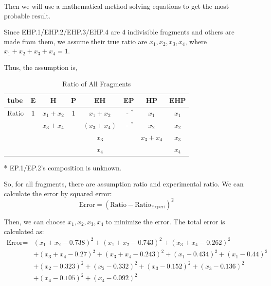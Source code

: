 \documentclass{article}
\begin{document}
            Then we will use a mathematical method solving equations to get the most probable result.

            Since EHP.1/EHP.2/EHP.3/EHP.4 are 4 indivisible fragments and others are made from them, we assume their true ratio are $x_1, x_2, x_3, x_4$, where $x_1 + x_2 + x_3 + x_4 = 1$.

            Thus, the assumption is,
            \begin{table}[H]
                \caption{Ratio of All Fragments}
                \centering
                \begin{threeparttable}
                    \begin{tabular}{|l|c|c|c|c|c|c|c|}
                        \hline
                        tube&E&H&P&EH&EP&HP&EHP\\
                        \hline
                        Ratio&1&$x_1 + x_2$&1&$x_1 + x_2$&$\text{ - }^*$&$x_1$&$x_1$\\
                        &&$x_3 + x_4$&&$(x_3 + x_4)$&$\text{ - }^*$&$x_2$&$x_2$\\
                        &&&&$x_3$&&$x_3 + x_4$&$x_3$\\
                        &&&&$x_4$&&&$x_4$\\
                        \hline
                    \end{tabular}
                    \begin{tablenotes}
                            \footnotesize
                            \item[*] EP.1/EP.2's composition is unknown.
                        \end{tablenotes}
                \end{threeparttable}
                \label{data.ratio.x}
            \end{table}

            So, for all fragments, there are assumption ratio and experimental ratio. We can calculate the error by squared error:
            $$\text{Error} = (\text{Ratio} - \text{Ratio}_{\text{Experi}})^2$$

            Then, we can choose $x_1, x_2, x_3, x_4$ to minimize the error. The total error is calculated as:
            $$\begin{aligned}
            \text{Error} = &(x_1 + x_2 - 0.738) ^ 2 + (x_1 + x_2 - 0.743) ^ 2 + (x_3 + x_4 - 0.262) ^ 2\\
            &+(x_3 + x_4 - 0.27) ^ 2 + (x_3 + x_4 - 0.243) ^ 2 + (x_1 - 0.434)^2 + (x_1 - 0.44)^2\\
            &+(x_2 - 0.323)^2 + (x_2 - 0.332)^2 + (x_3 - 0.152)^2 + (x_3 - 0.136)^2\\
            &+(x_4 - 0.105)^2 + (x_4 - 0.092)^2\\
            \end{aligned}$$
\end{document}
